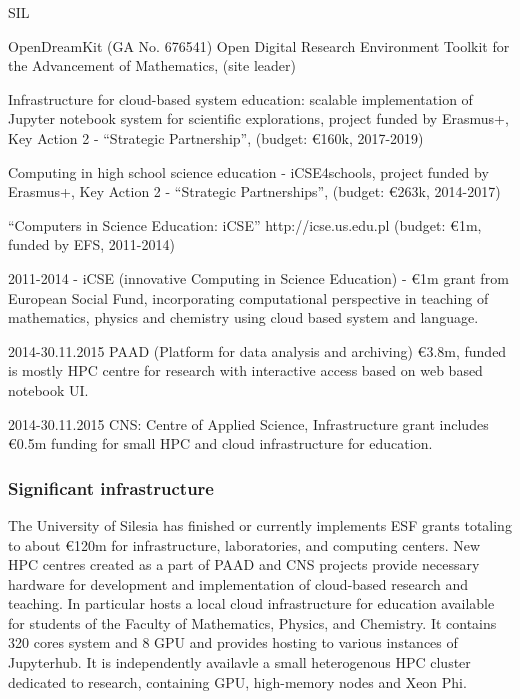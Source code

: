 \begin{sitedescription}{SIL}
\begin{compactenum}
\item OpenDreamKit (GA No. 676541) Open Digital Research Environment
  Toolkit for the Advancement of Mathematics, (site leader)
  \item Infrastructure for cloud-based system education: scalable 
  implementation of Jupyter notebook system for scientific explorations, project funded by Erasmus+, Key Action 2 - ``Strategic Partnership'', (budget: \euro{160}k, 2017-2019)
  \item Computing in high school science education - iCSE4schools,
    project funded by Erasmus+, Key Action 2 - ``Strategic Partnerships'',
    (budget: \euro{263}k, 2014-2017)
  \item ``Computers in Science Education: iCSE'' http://icse.us.edu.pl
    (budget: \euro{1}m, funded by EFS, 2011-2014)
  \item 2011-2014 - iCSE (innovative Computing in Science Education) -
      \euro 1m grant from European Social Fund, incorporating
      computational perspective in teaching of mathematics, physics and
      chemistry using cloud based \Sage system and \Python language.
    \item 2014-30.11.2015 PAAD (Platform for data analysis and archiving) 
    \euro 3.8m, funded is mostly HPC centre for research with
      interactive access based on web based notebook UI.
    \item 2014-30.11.2015 CNS: Centre of Applied Science,
      Infrastructure grant includes \euro 0.5m funding for small HPC and
      cloud infrastructure for education. 

\end{compactenum}

\subsubsection*{Significant infrastructure}

The University of Silesia has finished or currently implements ESF grants
totaling to about \euro 120m for infrastructure, laboratories, and
computing centers. New HPC centres created as a part of PAAD and
CNS projects provide necessary hardware for development
and implementation of cloud-based research and teaching. In particular 
 hosts a local cloud infrastructure for education available for students of the Faculty of Mathematics, Physics, and Chemistry. It contains 320 cores system and 8 GPU and provides hosting to various instances of Jupyterhub. It is independently availavle a small heterogenous HPC cluster dedicated to research, containing GPU, high-memory nodes and Xeon Phi. 


\end{sitedescription}
